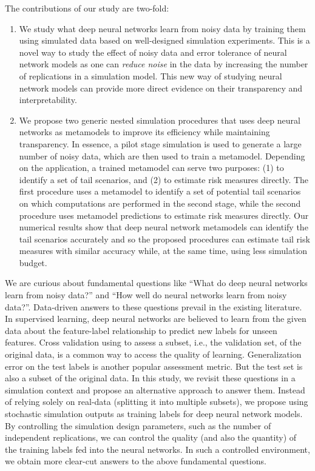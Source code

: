 \documentclass[]{article}
\begin{document}
The contributions of our study are two-fold:
\begin{enumerate}
    \item We study what deep neural networks learn from noisy data by training them using simulated data based on well-designed simulation experiments.
    This is a novel way to study the effect of noisy data and error tolerance of neural network models as one can \textit{reduce noise} in the data by increasing the number of replications in a simulation model.
    This new way of studying neural network models can provide more direct evidence on their transparency and interpretability.  
    \item We propose two generic nested simulation procedures that uses deep neural networks as metamodels to improve its efficiency while maintaining transparency. 
    In essence, a pilot stage simulation is used to generate a large number of noisy data, which are then used to train a metamodel.
    Depending on the application, a trained metamodel can serve two purposes: (1) to identify a set of tail scenarios, and (2) to estimate risk measures directly.
    The first procedure uses a metamodel to identify a set of potential tail scenarios on which computations are performed in the second stage, while the second procedure uses metamodel predictions to estimate risk measures directly.
    Our numerical results show that deep neural network metamodels can identify the tail scenarios accurately and so the proposed procedures can estimate tail risk measures with similar accuracy while, at the same time, using less simulation budget.
\end{enumerate}

We are curious about fundamental questions like ``What do deep neural networks learn from noisy data?'' and ``How well do neural networks learn from noisy data?''.
Data-driven answers to these questions prevail in the existing literature.
In supervised learning, deep neural networks are believed to learn from the given data about the feature-label relationship to predict new labels for unseen features.
Cross validation using to assess a subset, i.e., the validation set, of the original data, is a common way to access the quality of learning.
Generalization error on the test labels is another popular assessment metric.
But the test set is also a subset of the original data.
In this study, we revisit these questions in a simulation context and propose an alternative approach to answer them.
Instead of relying solely on real-data (splitting it into multiple subsets), we propose using stochastic simulation outputs as training labels for deep neural network models.
By controlling the simulation design parameters, such as the number of independent replications, we can control the quality (and also the quantity) of the training labels fed into the neural networks.
In such a controlled environment, we obtain more clear-cut answers to the above fundamental questions.
\end{document}
